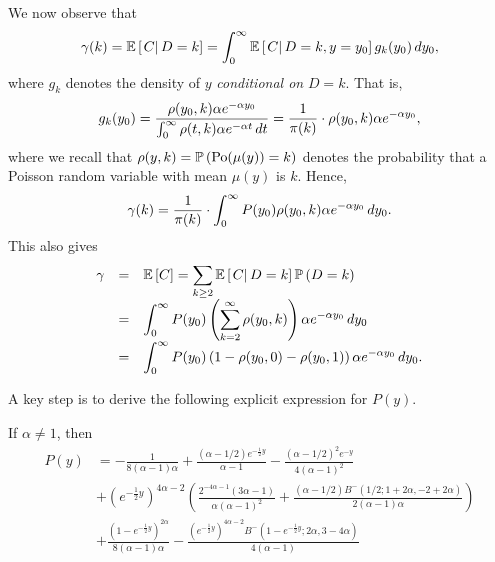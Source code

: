 We now observe that 
\[
	\gamma(k) = \mathbb{E}\left[\left.C\right|D=k\right] = \int_0^\infty \mathbb{E}\left[\left.C\right|D=k, y=y_0\right] g_k(y_0) \, d y_0,
\]
where $g_k$ denotes the density of $y$ {\em conditional on} $D=k$. That is,
\[
	g_k(y_0)  = \frac{\rho(y_0, k) \alpha e^{-\alpha y_0} }{\int_0^\infty \rho(t, k) \alpha e^{-\alpha t} \, d t}
	= \frac{1}{{\pi}(k)} \cdot \rho(y_0, k) \alpha e^{-\alpha y_0},
\]
where we recall that $\rho(y,k) = \mathbb{P}\left({\mathrm{Po}}(\mu(y)) = k\right)$ denotes the probability that a Poisson random variable with mean $\mu(y)$ is $k$. Hence, 
\begin{equation}\label{eq:gammakint}
\gamma(k) 
= \frac{1}{{\pi}(k)} \cdot \int_0^\infty P(y_0) \rho(y_0,k) \alpha e^{-\alpha y_0} \, d y_0. 
\end{equation}
This also gives
\begin{equation}\label{eq:gammaint}
\begin{array}{rcl} 
\gamma 
& = & \displaystyle \mathbb{E}\left[C\right] = \sum_{k\geq 2} \mathbb{E}\left[\left. C \right| D=k \right]\mathbb{P}\left( D=k \right) \\
& = & \displaystyle \int_0^\infty P(y_0) \left( \sum_{k=2}^\infty \rho(y_0,k) \right) \alpha e^{-\alpha y_0} \, d y_0 \\
& = & \displaystyle \int_0^\infty P(y_0) \left(1 - \rho(y_0,0)-\rho(y_0,1)\right) \alpha e^{-\alpha y_0} \, d y_0.
\end{array}
\end{equation}


A key step is to derive the following explicit expression for $P(y)$.

\begin{lemma}\label{lem:Paneq1}
	If $\alpha \not = 1$, then
	\begin{align*}
	 P(y) &=-\frac{1}{8 (\alpha - 1) \alpha} + \frac{(\alpha - 1/2) e^{-\frac{1}{2}y}}{\alpha - 1} - \frac{(\alpha - 1/2)^2 e^{-y}}{
		4 (\alpha - 1)^2} \\
	&+ 
	(e^{-\frac{1}{2}y})^{4\alpha -2} \left(\frac{2^{-4 \alpha-1} (3 \alpha - 1)}{\alpha (\alpha - 1)^2} 
		+ \frac{(\alpha - 1/2 ) B^-(1/2; 1 + 2 \alpha, -2 + 2 \alpha)}{2(\alpha - 1) \alpha} \right) \\
	&+ \frac{(1 - 
		e^{-\frac{1}{2}y})^{2 \alpha}}{8 (\alpha - 1) \alpha} - \frac{  
		(e^{-\frac{1}{2}y})^{4 \alpha - 2} B^-(1 - e^{-\frac{1}{2}y}; 2 \alpha, 3 - 4 \alpha)}{4 (\alpha - 1)}
	\end{align*}
\end{lemma}


